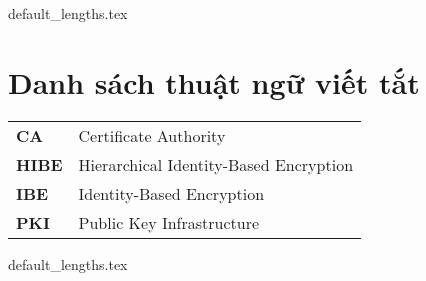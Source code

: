 \documentclass[class=report, crop=false]{standalone}
\begin{document}
	{default_lengths.tex}
	\baselineskip
	\chapter*{Danh sách thuật ngữ viết tắt}
	\begin{tabu}{>{\large\bfseries}m{2cm} >{\large}X[l]}
		CA		&	Certificate Authority						\\
		HIBE	&	Hierarchical Identity-Based Encryption 		\\
		IBE		&	Identity-Based Encryption 					\\
		PKI		&	Public Key Infrastructure					\\

	\end{tabu}
	\newpage
	{default_lengths.tex}
\end{document}
